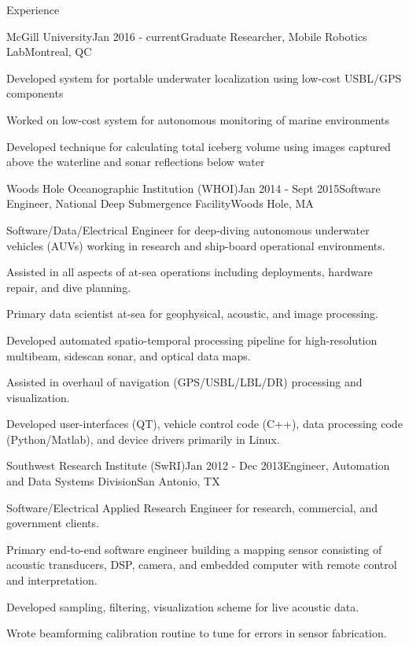 \documentclass{resume} %
\begin{document}
\begin{rSection}{Experience}

\begin{rSubsection}{McGill University}{Jan 2016 - current}{Graduate Researcher, Mobile Robotics Lab}{Montreal, QC}
\item{Developed system for portable underwater localization using low-cost USBL/GPS components} 
\item{Worked on low-cost system for autonomous monitoring of marine environments}
\item{Developed technique for calculating total iceberg volume using images captured above the  waterline and sonar reflections below water}
\end{rSubsection}

\begin{rSubsection}{Woods Hole Oceanographic Institution (WHOI)}{Jan 2014 - Sept 2015}{Software Engineer, National Deep Submergence Facility}{Woods Hole, MA}
\item{Software/Data/Electrical Engineer for deep-diving autonomous underwater vehicles (AUVs) working in research and ship-board operational environments.}
\item{Assisted in all aspects of at-sea operations including deployments, hardware repair, and dive planning.}
\item{Primary data scientist at-sea for geophysical, acoustic, and image processing.}
\item{Developed automated spatio-temporal processing pipeline for high-resolution multibeam, sidescan sonar, and optical data maps.}
\item{Assisted in overhaul of navigation (GPS/USBL/LBL/DR) processing and visualization.}
\item{Developed user-interfaces (QT), vehicle control code (C++), data processing code (Python/Matlab), and device drivers primarily in Linux.}
\end{rSubsection}
%
\begin{rSubsection}{Southwest Research Institute (SwRI)}{Jan 2012 - Dec 2013}{Engineer, Automation and Data Systems Division}{San Antonio, TX}{}
\item{Software/Electrical Applied Research Engineer for research, commercial, and government clients.}
\item{Primary end-to-end software engineer building a mapping sensor consisting of acoustic transducers, DSP, camera, and embedded computer with remote control and interpretation.}
\item{Developed sampling, filtering, visualization scheme for live acoustic data.}
\item{Wrote beamforming calibration routine to tune for errors in sensor fabrication.}
\end{rSubsection}


\end{rSection}
\end{document}

